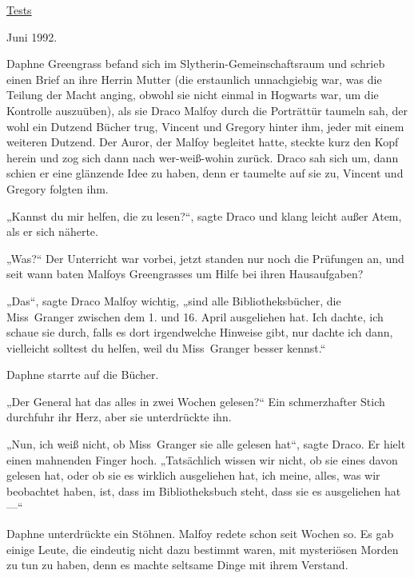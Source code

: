 

\hypertarget{tests}{%

\uline{Tests}

Juni 1992.

Daphne Greengrass befand sich im Slytherin-Gemeinschaftsraum und schrieb einen Brief an ihre Herrin Mutter (die erstaunlich unnachgiebig war, was die Teilung der Macht anging, obwohl sie nicht einmal in Hogwarts war, um die Kontrolle auszuüben), als sie Draco Malfoy durch die Porträttür taumeln sah, der wohl ein Dutzend Bücher trug, Vincent und Gregory hinter ihm, jeder mit einem weiteren Dutzend. Der Auror, der Malfoy begleitet hatte, steckte kurz den Kopf herein und zog sich dann nach wer-weiß-wohin zurück. Draco sah sich um, dann schien er eine glänzende Idee zu haben, denn er taumelte auf sie zu, Vincent und Gregory folgten ihm.

„Kannst du mir helfen, die zu lesen?“, sagte Draco und klang leicht außer Atem, als er sich näherte.

„Was?“ Der Unterricht war vorbei, jetzt standen nur noch die Prüfungen an, und seit wann baten Malfoys Greengrasses um Hilfe bei ihren Hausaufgaben?

„Das“, sagte Draco Malfoy wichtig, „sind alle Bibliotheksbücher, die Miss~Granger zwischen dem 1. und 16. April ausgeliehen hat. Ich dachte, ich schaue sie durch, falls es dort irgendwelche Hinweise gibt, nur dachte ich dann, vielleicht solltest du helfen, weil du Miss~Granger besser kennst.“

Daphne starrte auf die Bücher.

„Der General hat das alles in zwei Wochen gelesen?“ Ein schmerzhafter Stich durchfuhr ihr Herz, aber sie unterdrückte ihn.

„Nun, ich weiß nicht, ob Miss~Granger sie alle gelesen hat“, sagte Draco. Er hielt einen mahnenden Finger hoch. „Tatsächlich wissen wir nicht, ob sie eines davon gelesen hat, oder ob sie es wirklich ausgeliehen hat, ich meine, alles, was wir beobachtet haben, ist, dass im Bibliotheksbuch steht, dass sie es ausgeliehen hat—“

Daphne unterdrückte ein Stöhnen. Malfoy redete schon seit Wochen so. Es gab einige Leute, die eindeutig nicht dazu bestimmt waren, mit mysteriösen Morden zu tun zu haben, denn es machte seltsame Dinge mit ihrem Verstand.

}
